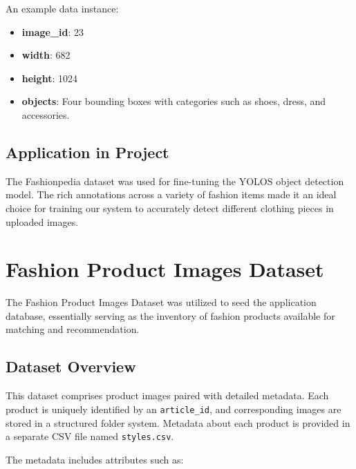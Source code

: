 An example data instance:

\vspace{-1.25em}
\begin{itemize}
    \setlength\itemsep{-1.5em}
    \item \textbf{image\_id}: 23
    \item \textbf{width}: 682
    \item \textbf{height}: 1024
    \item \textbf{objects}: Four bounding boxes with categories such as shoes, dress, and accessories.
\end{itemize}

\subsection{Application in Project}

The Fashionpedia dataset was used for fine-tuning the YOLOS object detection model. The rich annotations across a variety of fashion items made it an ideal choice for training our system to accurately detect different clothing pieces in uploaded images.

\section{Fashion Product Images Dataset}

The Fashion Product Images Dataset was utilized to seed the application database, essentially serving as the inventory of fashion products available for matching and recommendation.

\subsection{Dataset Overview}

This dataset comprises product images paired with detailed metadata. Each product is uniquely identified by an \texttt{article\_id}, and corresponding images are stored in a structured folder system. Metadata about each product is provided in a separate CSV file named \texttt{styles.csv}.

The metadata includes attributes such as:

